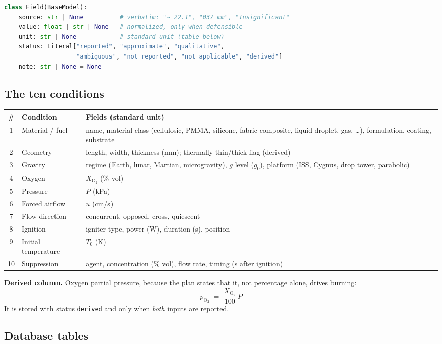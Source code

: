 \documentclass[11pt,a4paper]{article}
\newcommand{\code}[1]{\texttt{#1}}
\begin{document}
\begin{lstlisting}[language=Python]
class Field(BaseModel):
    source: str | None          # verbatim: "~ 22.1", "037 mm", "Insignificant"
    value: float | str | None   # normalized, only when defensible
    unit: str | None            # standard unit (table below)
    status: Literal["reported", "approximate", "qualitative",
                    "ambiguous", "not_reported", "not_applicable", "derived"]
    note: str | None = None
\end{lstlisting}

\subsection{The ten conditions}

\begin{tabularx}{\linewidth}{@{}c p{3.4cm} L@{}}
\toprule
\# & \textbf{Condition} & \textbf{Fields (standard unit)}\\
 & Material / fuel & name, material class (cellulosic, PMMA, silicone, fabric composite, liquid droplet, gas, \dots), formulation, coating, substrate\\
2 & Geometry & length, width, thickness (mm); thermally thin/thick flag (derived)\\
3 & Gravity & regime (Earth, lunar, Martian, microgravity), $g$ level ($g_0$), platform (ISS, Cygnus, drop tower, parabolic)\\
4 & Oxygen & $X_{\mathrm{O_2}}$ (\% vol)\\
5 & Pressure & $P$ (kPa)\\
6 & Forced airflow & $u$ (cm/s)\\
7 & Flow direction & concurrent, opposed, cross, quiescent\\
8 & Ignition & igniter type, power (W), duration (s), position\\
9 & Initial temperature & $T_0$ (K)\\
10 & Suppression & agent, concentration (\% vol), flow rate, timing (s after ignition)\\
\bottomrule
\end{tabularx}

\medskip
\noindent\textbf{Derived column.} Oxygen partial pressure, because the plan states that it, not percentage alone,
drives burning:
\[
  p_{\mathrm{O_2}} \;=\; \dfrac{X_{\mathrm{O_2}}}{100}\, P
\]
It is stored with status \code{derived} and only when \emph{both} inputs are reported.

\subsection{Database tables}
\end{document}

